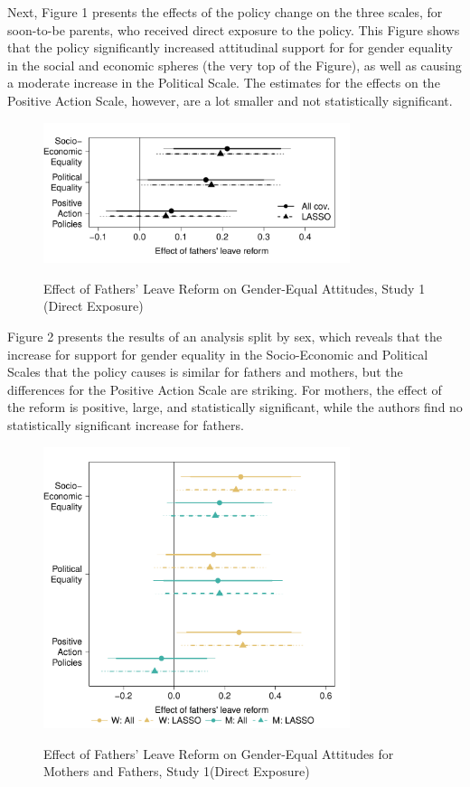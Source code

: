 \documentclass[12pt,letterpaper]{article}
\begin{document}
\newpage
\noindent Next, Figure 1 presents the effects of the policy change on the three scales, for soon-to-be parents, who received direct exposure to the policy. This Figure shows that the policy significantly increased attitudinal support for for gender equality in the social and economic spheres (the very top of the Figure), as well as causing a moderate increase in the Political Scale. The estimates for the effects on the Positive Action Scale, however, are a lot smaller and not statistically significant. 

\begin{figure}[H]
	\centering
	\caption{Effect of Fathers’ Leave Reform on Gender-Equal Attitudes, Study 1 (Direct Exposure)}
	\includegraphics[width=0.8\textwidth]{Fig1}
	\label{fig:my_label}
\end{figure}

\newpage
\noindent Figure 2 presents the results of an analysis split by sex, which reveals that the increase for support for gender equality in the Socio-Economic and Political Scales that the policy causes is similar for fathers and mothers, but the differences for the Positive Action Scale are striking. For mothers, the effect of the reform is positive, large, and statistically significant, while the authors find no statistically significant increase for fathers. 

\begin{figure}[H]
	\centering
	\caption{Effect of Fathers’ Leave Reform on Gender-Equal Attitudes for Mothers and Fathers, Study 1(Direct Exposure)}
	\includegraphics[width=0.8\textwidth]{Fig2}
	\label{fig:my_label}
\end{figure}
\end{document}
